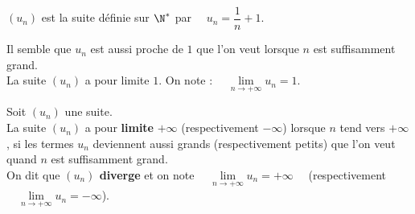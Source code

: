 \documentclass[a4paper,11pt,cours]{nsi} %
\begin{document}
\begin{exemple}[]
    $(u_n)$ est la suite définie sur $\N^*$ par $\quad u_n=\dfrac{1}{n}+1$.
    \begin{center}
        \def\xmin{-1} \def\ymin{-2}\def\xmax{11}\def\ymax{3}
    \end{center}
    Il semble que $u_n$ est aussi proche de $1$ que l'on veut lorsque $n$ est suffisamment grand.\\
    La suite $(u_n)$ a pour limite $1$. On note : $\quad \lim\limits_{n\to+\infty} u_n=1$.
\end{exemple}


\begin{definition}
    Soit $(u_n)$ une suite.\\
    La suite $(u_n)$ a pour \textbf{limite} $+\infty$ (respectivement $-\infty$) lorsque $n$ tend vers $+\infty$, si les termes $u_n$ deviennent aussi grands (respectivement petits) que l'on veut quand $n$ est suffisamment grand.\\[.5em]
    On dit que \textbf{$(u_n)$ diverge} et on note $\quad\lim\limits_{n\to+\infty}u_n=+\infty\quad$ (respectivement $\quad\lim\limits_{n\to+\infty}u_n=-\infty$).
\end{definition}
\end{document}
